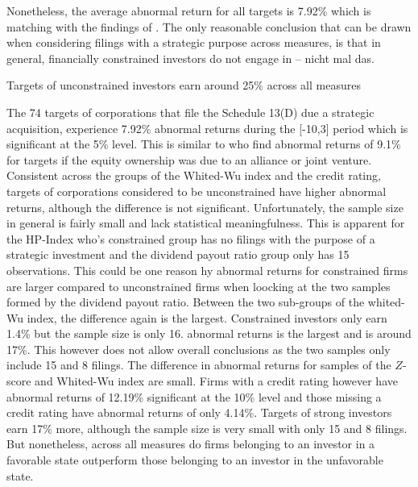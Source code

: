 \documentclass[12pt]{article}
\begin{document}
Nonetheless, the average abnormal return for all targets is 7.92\% which is matching with the findings of \citet[p.2803]{Allen2000}. The only reasonable conclusion that can be drawn when considering filings with a strategic purpose across measures, is that in general, financially constrained investors do not engage in -- nicht mal das. 



Targets of unconstrained investors earn around 25\% across all measures 

The 74 targets of corporations that file the Schedule 13(D) due a strategic acquisition, experience 7.92\% abnormal returns during the [-10,3] period which is significant at the 5\% level. This is similar to \citet[p.2803]{Allen2000} who find abnormal returns of 9.1\% for targets if the equity ownership was due to an alliance or joint venture. Consistent across the groups of the Whited-Wu index and the credit rating, targets of corporations considered to be unconstrained have higher abnormal returns, although the difference is not significant. Unfortunately, the sample size in general is fairly small and lack statistical meaningfulness. This is apparent for the HP-Index who's constrained group has no filings with the purpose of a strategic investment and the dividend payout ratio group only has 15 observations. This could be one reason hy abnormal returns for constrained firms are larger compared to unconstrained firms when loocking at the two samples formed by the dividend payout ratio.
Between the two sub-groups of the whited-Wu index, the difference again is the largest. Constrained investors only earn 1.4\% but the sample size is only 16. abnormal returns is the largest and is around 17\%. This however does not allow overall conclusions as the two samples only include 15 and 8 filings. The difference in abnormal returns for samples of the $Z$-score and Whited-Wu index are small. Firms with a credit rating however have abnormal returns of 12.19\% significant at the 10\% level and those missing a credit rating have abnormal returns of only 4.14\%. 
Targets of strong investors earn 17\% more, although the sample size is very small with only 15 and 8 filings. But nonetheless, across all measures do firms belonging to an investor in a favorable state outperform those belonging to an investor in the unfavorable state. 
\end{document}

